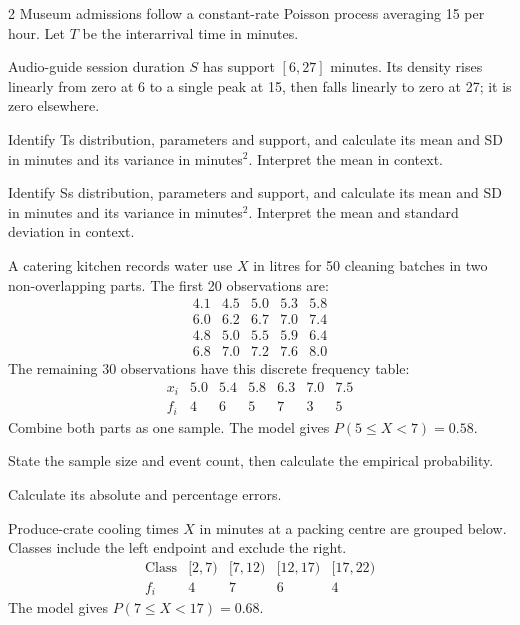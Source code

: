 \begin{multicols}{2}
Museum admissions follow a constant-rate Poisson process averaging 15 per hour. Let $T$ be the interarrival time in minutes.

Audio-guide session duration $S$ has support $[6,27]$ minutes. Its density rises linearly from zero at 6 to a single peak at 15, then falls linearly to zero at 27; it is zero elsewhere.

Identify T\textquotesingle s distribution, parameters and support, and calculate its mean and SD in minutes and its variance in minutes$^2$. Interpret the mean in context. 

Identify S\textquotesingle s distribution, parameters and support, and calculate its mean and SD in minutes and its variance in minutes$^2$. Interpret the mean and standard deviation in context. 


A catering kitchen records water use $X$ in litres for 50 cleaning batches in two non-overlapping parts. The first 20 observations are:
\[\begin{array}{rrrrr}4.1&4.5&5.0&5.3&5.8\\6.0&6.2&6.7&7.0&7.4\\4.8&5.0&5.5&5.9&6.4\\6.8&7.0&7.2&7.6&8.0\end{array}\]
The remaining 30 observations have this discrete frequency table:
\[\begin{array}{c|rrrrrr}x_i&5.0&5.4&5.8&6.3&7.0&7.5\\\hline f_i&4&6&5&7&3&5\end{array}\]
Combine both parts as one sample. The model gives $P(5\le X<7)=0.58$.

State the sample size and event count, then calculate the empirical probability. 

Calculate its absolute and percentage errors. 


\columnbreak

Produce-crate cooling times $X$ in minutes at a packing centre are grouped below. Classes include the left endpoint and exclude the right.
\[\begin{array}{c|rrrr}\text{Class}&[2,7)&[7,12)&[12,17)&[17,22)\\\hline f_i&4&7&6&4\end{array}\]
The model gives $P(7\le X<17)=0.68$.


\end{multicols}
